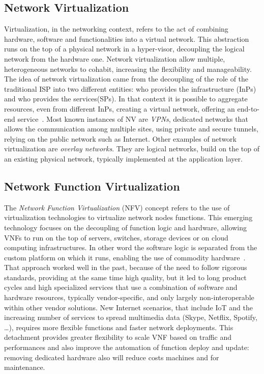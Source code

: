 \subsection{Network Virtualization}
Virtualization, in the networking context, refers to the act of combining
hardware, software and functionalities into a virtual network. This abstraction
runs on the top of a physical network in a hyper-visor, decoupling the logical
network from the hardware one. Network virtualization allow multiple,
heterogeneous networks to cohabit, increasing the flexibility and manageability.
The idea of network virtualization came from the decoupling of the role of the
traditional ISP into two different entities: who provides the infrastructure
(InPs) and who provides the services(SPs). In that context it is possible to
aggregate resources, even from different InPs, creating a virtual network,
offering an end-to-end service~\cite{chowdhury2009network}. Most known
instances of NV are \emph{VPNs}, dedicated networks that allows the
communication among multiple sites, using
private and secure tunnels, relying on the public network such as Internet.
Other examples of network virtualization are \emph{overlay networks}. They are
logical networks, build on the top of an existing physical network, typically
implemented at the application layer. 


\subsection{Network Function Virtualization}
The \emph{Network Function Virtualization} (NFV) concept refers to the use of 
virtualization technologies to virtualize network nodes functions. This
emerging technology focuses on the decoupling of function logic and hardware,
allowing VNFs to run on the top of servers, switches, storage 
devices or on cloud computing infrastructures. In other word the software logic
is separated from the custom platform on which it runs, enabling the use of
commodity hardware~\cite{gray2016network}.
That approach worked well in the past, because of the need to follow rigorous 
standards, providing at the same time high quality, but it led to long product 
cycles and high specialized services that use a combination of software and
hardware resources, typically vendor-specific, and only largely
non-interoperable within other vendor solutions. New Internet scenarios, that 
include IoT and the increasing number of services to spread multimedia data 
(Skype, Netflix, Spotify, \dots), requires more flexible functions and faster 
network deployments. 
This detachment provides greater flexibility to scale VNF based on traffic and
performances and also improve the automation of function deploy and update:
removing dedicated hardware also will reduce costs machines and for
maintenance. 


